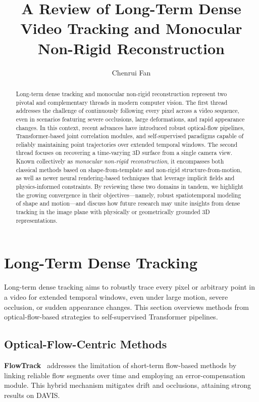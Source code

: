 \documentclass[11pt]{article}
\begin{document}
\title{A Review of Long-Term Dense Video Tracking and Monocular Non-Rigid Reconstruction}
\author{Chenrui Fan}
\date{}

\maketitle


\begin{abstract}
Long-term dense tracking and monocular non-rigid reconstruction represent two pivotal and complementary threads in modern computer vision. The first thread addresses the challenge of continuously following every pixel across a video sequence, even in scenarios featuring severe occlusions, large deformations, and rapid appearance changes. In this context, recent advances have introduced robust optical-flow pipelines, Transformer-based joint correlation modules, and self-supervised paradigms capable of reliably maintaining point trajectories over extended temporal windows. The second thread focuses on recovering a time-varying 3D surface from a single camera view. Known collectively as \emph{monocular non-rigid reconstruction}, it encompasses both classical methods based on shape-from-template and non-rigid structure-from-motion, as well as newer neural rendering-based techniques that leverage implicit fields and physics-informed constraints. By reviewing these two domains in tandem, we highlight the growing convergence in their objectives—namely, robust spatiotemporal modeling of shape and motion—and discuss how future research may unite insights from dense tracking in the image plane with physically or geometrically grounded 3D representations.
\end{abstract}


\section{Long-Term Dense Tracking}
Long-term dense tracking aims to robustly trace every pixel or arbitrary point in a video for extended temporal windows, even under large motion, severe occlusion, or sudden appearance changes. This section overviews methods from optical-flow-based strategies to self-supervised Transformer pipelines.

\subsection{Optical-Flow-Centric Methods}
\textbf{FlowTrack}~\cite{cho2024flowtrack} addresses the limitation of short-term flow-based methods by linking reliable flow segments over time and employing an error-compensation module. This hybrid mechanism mitigates drift and occlusions, attaining strong results on DAVIS.
\end{document}
